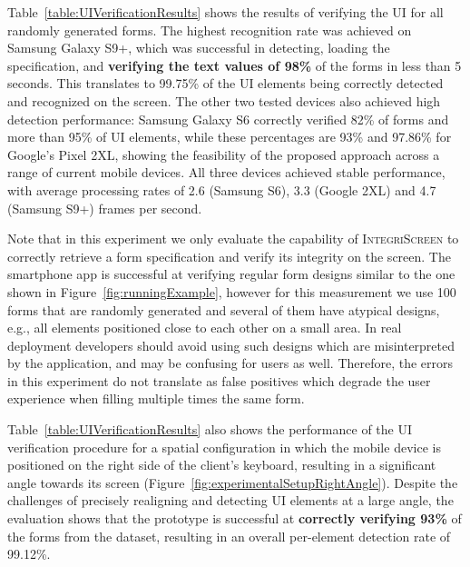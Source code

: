 \documentclass[sigconf, anonymous, balance=false]{acmart}
\newcommand{\app}{smartphone app\xspace}
\newcommand{\myparagraph}[1]{\myparagraphnodot{#1.}}
\newcommand{\myparagraphnodot}[1]{\vspace{4pt} \noindent {\bfseries #1}\xspace}
\newcommand{\updatelater}[1]{#1\xspace}
\newcommand{\sysname}{\textsc{IntegriScreen}\xspace}
\begin{document}
\myparagraph{Results}
Table~\ref{table:UIVerificationResults} shows the results of verifying the UI for all randomly generated forms. The highest recognition rate was achieved on Samsung Galaxy S9+, which was successful in detecting, loading the specification, and \textbf{verifying the text values of 98\%} of the forms in less than 5 seconds.
This translates to 99.75\% of the UI elements being correctly detected and recognized on the screen.
The other two tested devices also achieved high detection performance: Samsung Galaxy S6 correctly verified 82\% of forms and more than 95\% of UI elements, while these percentages are 93\% and 97.86\% for Google's Pixel 2XL, showing the feasibility of the proposed approach across a range of current mobile devices.
All three devices achieved stable performance, with average processing rates of \updatelater{2.6} (Samsung S6), \updatelater{3.3} (Google 2XL) and \updatelater{4.7} (Samsung S9+) frames per second.

Note that in this experiment we only evaluate the capability of \sysname to correctly retrieve a form specification and verify its integrity on the screen. The \app is successful at verifying regular form designs similar to the one shown in Figure~\ref{fig:runningExample}, however for this measurement we use 100 forms that are randomly generated and several of them have atypical designs, e.g., all elements positioned close to each other on a small area.
In real deployment developers should avoid using such designs which are misinterpreted by the application, and may be confusing for users as well.
Therefore, the errors in this experiment do not translate as false positives which degrade the user experience when filling multiple times the same form.

\myparagraph{Positioning and verification time}
Table~\ref{table:UIVerificationResults} also shows the performance of the UI verification procedure for a spatial configuration in which the mobile device is positioned on the right side of the client's keyboard, resulting in a significant angle towards its screen (Figure~\ref{fig:experimentalSetupRightAngle}).
Despite the challenges of precisely realigning and detecting UI elements at a large angle, the evaluation shows that the prototype is successful at \textbf{correctly verifying 93\%} of the forms from the dataset, resulting in an overall per-element detection rate of 99.12\%.
\end{document}
